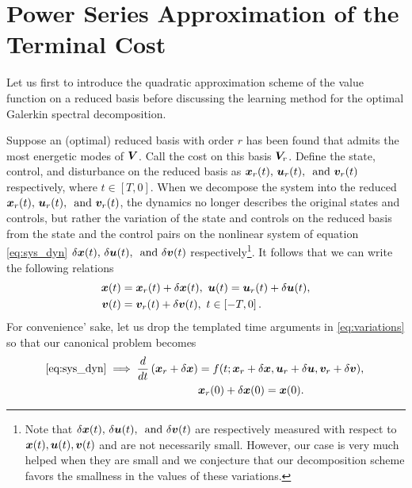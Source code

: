 \section{Power Series Approximation of the Terminal Cost}
%
Let us first to introduce the quadratic approximation scheme of the value function on a reduced basis before discussing the learning method for the optimal Galerkin spectral decomposition. 

Suppose an (optimal) reduced basis with order $r$ has been found that admits the most energetic modes of $\bm{V}$. Call the cost on this basis $\bm{V}_r$. Define the state, control, and disturbance on the reduced basis as $\bm{x}_r(t), \, \bm{u}_r(t), \, \text{ and } \bm{v}_r(t)$ respectively, where $t \in \left[T, 0\right]$. When we decompose the system into the reduced  $\bm{x}_r(t), \, \bm{u}_r(t), \, \text{ and } \bm{v}_r(t)$, the dynamics no longer describes the original states and controls, but rather the variation of the state and controls on the reduced basis from the state and the control pairs on the nonlinear system of equation \eqref{eq:sys_dyn} \ie $\delta \bm{x}(t), \, \delta \bm{u}(t), \,\text{ and } \delta \bm{v}(t)$ respectively\footnote{Note that $\delta \bm{x}(t), \, \delta \bm{u}(t), \,\text{ and } \delta \bm{v}(t)$ are respectively measured with respect to $\bm{x}(t), \bm{u}(t), \bm{v}(t)$ and are not necessarily small. However, our case is very much helped when they are small and we conjecture that our decomposition scheme favors the smallness in the values of these variations.}. It follows that we can write the following relations
%
\begin{subequations}
	\begin{align}
		\bm{x}(t) &= \bm{x}_r(t) + \delta\bm{x}(t), \,\, 	\bm{u}(t) = \bm{u}_r(t) + \delta\bm{u}(t), \\
		\bm{v}(t) &= \bm{v}_r(t) + \delta\bm{v}(t), \,\, t \in \left[-T, 0\right].
	\end{align}
	\label{eq:variations}
\end{subequations}
%
For convenience' sake, let us drop the templated time arguments in \eqref{eq:variations} so that our canonical problem becomes
%
\begin{subequations}
	\begin{align}
		\eqref{eq:sys_dyn} \implies \dfrac{d}{dt}\left(\bm{x}_r + \delta \bm{x}\right) &= f(t; \bm{x}_r + \delta \bm{x}, \bm{u}_r + \delta \bm{u}, \bm{v}_r + \delta \bm{v}), \,  \\
		& \bm{x}_r(0) + \delta \bm{x}(0) = \bm{x}(0).
	\end{align}
\end{subequations}
